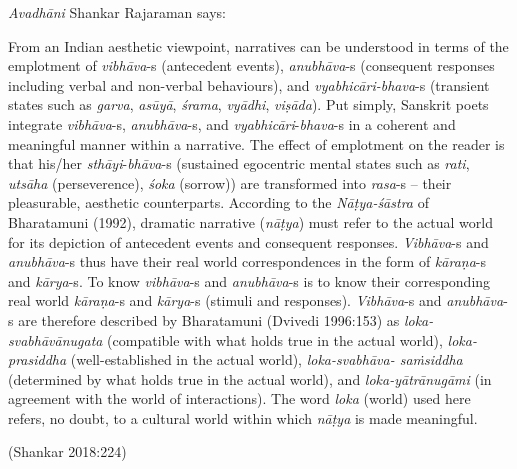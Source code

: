 \textsl{Avadhāni} Shankar Rajaraman says:

\begin{myquote}
From an Indian aesthetic viewpoint, narratives can be understood in terms of the emplotment of \textsl{vibhāva}-s (antecedent events), \hbox{\textsl{anubhāva}-s} (consequent responses including verbal and non-verbal behaviours), and \textsl{vyabhicāri-bhava}-s (transient states such as \textsl{garva}, \textsl{asūyā}, \textsl{śrama}, \textsl{vyādhi}, \textsl{viṣāda}). Put simply, Sanskrit poets integrate \textsl{vibhāva}-s, \textsl{anubhāva}-s, and \textsl{vyabhicāri}-\textsl{bhava}-s in a coherent and meaningful manner within a narrative. The effect of emplotment on the reader is that his/her \textsl{sthāyi}-\textsl{bhāva}-s (sustained egocentric mental states such as \textsl{rati}, \textsl{utsāha} (perseverence), \textsl{śoka} (sorrow)) are transformed into \textsl{rasa}-s -- their pleasurable, aesthetic counterparts. According to the \textsl{Nāṭya-śāstra} of Bharatamuni (1992), dramatic narrative (\textsl{nāṭya}) must refer to the actual world for its depiction of antecedent events and consequent responses. \textsl{Vibhāva}-s and \textsl{anubhāva}-s thus have their real world correspondences in the form of \textsl{kāraṇa}-s and \textsl{kārya}-s. To know \textsl{vibhāva}-s and \textsl{anubhāva}-s is to know their corresponding real world \textsl{kāraṇa}-s and \textsl{kārya}-s (stimuli and responses). \textsl{Vibhāva}-s and \textsl{anubhāva}-s are therefore described by Bharatamuni (Dvivedi 1996:153) as \textsl{loka-svabhāvānugata} (compatible with what holds true in the actual world), \textsl{loka-prasiddha} (well-established in the actual world), \textsl{loka-svabhāva- saṁsiddha} (determined by what holds true in the actual world), and \textsl{loka-yātrānugāmi} (in agreement with the world of interactions). The word \textsl{loka} (world) used here refers, no doubt, to a cultural world within which \textsl{nāṭya} is made meaningful. 

\hfill(Shankar 2018:224)
\end{myquote}

